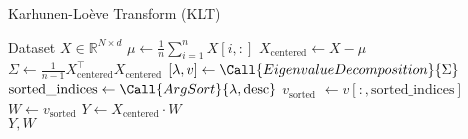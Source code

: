 \renewcommand{\algorithmicrequire}{\textbf{Input:}}

\begin{algorithm}[h]
\begin{algorithmic}[1]
\caption{Karhunen-Loève Transform (KLT)}
\label{algo:klt}

\Require Dataset $X \in \mathbb{R}^{N \times d}$ 
\State $\mu \gets \frac{1}{n} \sum_{i=1}^{n} X[i,:]$
\State $X_{\text{centered}} \gets X - \mu$
\State $\Sigma \gets \frac{1}{n-1} X_{\text{centered}}^\top X_{\text{centered}}^{ }$
\State $[\lambda, v] \gets \Call{EigenvalueDecomposition}{\Sigma}$
\State $\text{sorted\_indices} \gets \Call{ArgSort}{\lambda, \text{desc}}$
\State $v_{\text{sorted}}$ $\gets v[:, \text{sorted\_indices}]$
\State $W \gets v_{\text{sorted}}$ 
\State $Y \gets X_{\text{centered}} \cdot W$ \\
\Return $Y, W$


\end{algorithmic}
\end{algorithm}
